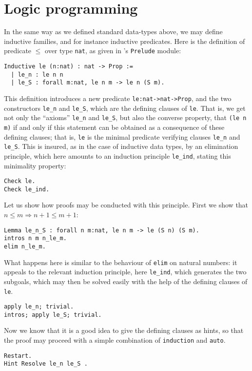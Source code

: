 \documentclass{book}
\begin{document}
\section{Logic programming}

In the same way as we defined standard data-types above, we
may define inductive families, and for instance inductive predicates.
Here is the definition of predicate $\le$ over type \verb:nat:, as
given in \Coq's \verb:Prelude: module:
\begin{lstlisting}
Inductive le (n:nat) : nat -> Prop :=
  | le_n : le n n
  | le_S : forall m:nat, le n m -> le n (S m).
\end{lstlisting}

This definition introduces a new predicate \verb+le:nat->nat->Prop+,
and the two constructors \verb:le_n: and \verb:le_S:, which are the
defining clauses of \verb:le:. That is, we get not only the ``axioms''
\verb:le_n: and \verb:le_S:, but also the converse property, that 
\verb:(le n m): if and only if this statement can be obtained as a
consequence of these defining clauses; that is, \verb:le: is the
minimal predicate verifying clauses \verb:le_n: and \verb:le_S:. This is
insured, as in the case of inductive data types, by an elimination principle,
which here amounts to an induction principle \verb:le_ind:, stating this 
minimality property:
\begin{lstlisting}
Check le.
Check le_ind.
\end{lstlisting}

Let us show how proofs may be conducted with this principle.
First we show that $n\le m \Rightarrow n+1\le m+1$:
\begin{lstlisting}
Lemma le_n_S : forall n m:nat, le n m -> le (S n) (S m).
intros n m n_le_m.
elim n_le_m.
\end{lstlisting}

What happens here is similar to the behaviour of \verb:elim: on natural
numbers: it appeals to the relevant induction principle, here \verb:le_ind:,
which generates the two subgoals, which may then be solved easily
with the help of the defining clauses of \verb:le:.
\begin{lstlisting}
apply le_n; trivial.
intros; apply le_S; trivial.
\end{lstlisting}

Now we know that it is a good idea to give the defining clauses as hints,
so that the proof may proceed with a simple combination of 
\verb:induction: and \verb:auto:.
\begin{lstlisting}
Restart.
Hint Resolve le_n le_S .
\end{lstlisting}
\end{document}
